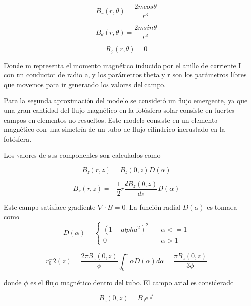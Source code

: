 \documentclass[9pt]{book}
\begin{document}
\begin{equation}
    B_r(r,\theta)=\frac{2mcos\theta}{r^3}
\end{equation}
  
\begin{equation}
    B_\theta(r,\theta)=\frac{2msin\theta}{r^3}
\end{equation}

\begin{equation}
    B_\phi(r,\theta)=0
\end{equation}

Donde m representa el momento magn\'etico inducido por el anillo de corriente I con un conductor de radio a, y los par\'ametros theta y r son los par\'ametros libres que movemos para ir generando los valores del campo.

Para la segunda aproximaci\'on del modelo se consider\'o un flujo emergente, ya que una gran cantidad del flujo magn\'etico en la fot\'osfera solar consiste en fuertes campos en elementos no resueltos. Este modelo consiste en un elemento magn\'etico con una simetr\'ia de un tubo de flujo cil\'indrico incrustado en la fot\'osfera.

Los valores de sus componentes son calculados como

\begin{equation}
B_z(r,z)=B_z(0,z)D(\alpha)
\end{equation}

\begin{equation}
B_r(r,z)=-\frac{1}{2}r\frac{dB_z(0,z)}{dz}D(\alpha)
\end{equation}

Este campo satisface gradiente $ \nabla \cdot B = 0 $. La funci\'on radial $D(\alpha)$ es tomada como
\begin{equation}
 D(\alpha) = 
    \begin{cases}
        (1-alpha^2)^2 & \quad \alpha <= 1 \\
        0   & \quad \alpha > 1
    \end{cases}
\end{equation}

\begin{equation} \label{r_flujo_emergente}
r_0^-2(z) = \frac{2\pi B_z(0,z)}{\phi} \int_{0}^{1} \alpha D(\alpha) d\alpha = \frac{\pi B_z(0,z)}{3 \phi}
\end{equation}

donde $\phi$ es el flujo magn\'etico dentro del tubo.
El campo axial es considerado

\begin{equation}
B_z(0,z)=B_0e^{\frac{-z}{h}}
\end{equation}
\end{document}
